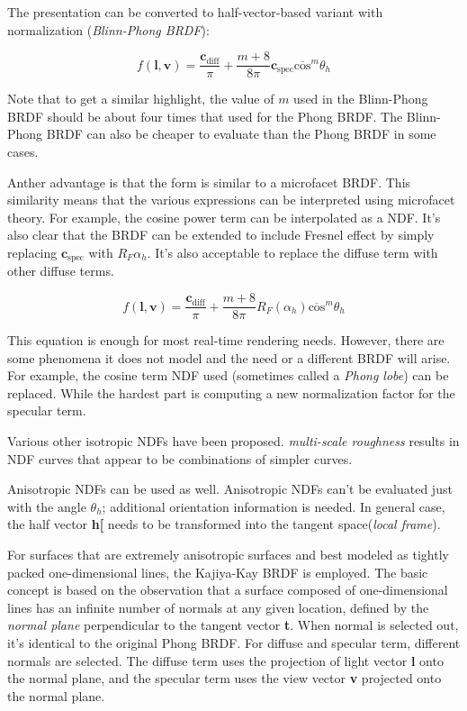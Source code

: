\documentclass[10pt, a4paper]{article}
\begin{document}
        The presentation can be converted to half-vector-based variant with normalization (\emph{Blinn-Phong BRDF}): 

        $$f(\textbf{l}, \textbf{v}) = \frac{\textbf{c}_{\text{diff}}}{\pi} + \frac{m + 8}{8\pi}\textbf{c}_{\text{spec}}\overline{\text{cos}}^m\theta_h$$ 

        Note that to get a similar highlight, the value of $m$ used in the Blinn-Phong BRDF should be about four times that used for the Phong BRDF. The Blinn-Phong BRDF can also be cheaper to evaluate than the Phong BRDF in some cases. 

        Anther advantage is that the form is similar to a microfacet BRDF. This similarity means that the various expressions can be interpreted using microfacet theory. For example, the cosine power term can be interpolated as a NDF. It's also clear that the BRDF can be extended to include Fresnel effect by simply replacing $\textbf{c}_{\text{spec}}$ with $R_F{\alpha_h}$. It's also acceptable to replace the diffuse term with other diffuse terms. 

        $$f(\textbf{l}, \textbf{v}) = \frac{\textbf{c}_{\text{diff}}}{\pi} + \frac{m + 8}{8\pi}R_F(\alpha_h)\overline{\text{cos}}^m\theta_h$$ 
        
        This equation is enough for most real-time rendering needs. However, there are some phenomena it does not model and the need or a different BRDF will arise. For example, the cosine term NDF used (sometimes called a \emph{Phong lobe}) can be replaced. While the hardest part is computing a new normalization factor for the specular term. 
        
        Various other isotropic NDFs have been proposed. \emph{multi-scale roughness} results in NDF curves that appear to be combinations of simpler curves. 

        Anisotropic NDFs can be used as well. Anisotropic NDFs can't be evaluated just with the angle $\theta_h$; additional orientation information is needed. In general case, the half vector \textbf{h[} needs to be transformed into the tangent space(\emph{local frame}).

        For surfaces that are extremely anisotropic surfaces and best modeled as tightly packed one-dimensional lines, the Kajiya-Kay BRDF is employed. The basic concept is based on the observation that a surface composed of one-dimensional lines has an infinite number of normals at any given location, defined by the \emph{normal plane} perpendicular to the tangent vector \textbf{t}. When normal is selected out, it's identical to the original Phong BRDF. For diffuse and specular term, different normals are selected. The diffuse term uses the projection of light vector \textbf{l} onto the normal plane, and the specular term uses the view vector \textbf{v} projected onto the normal plane. 
\end{document}
